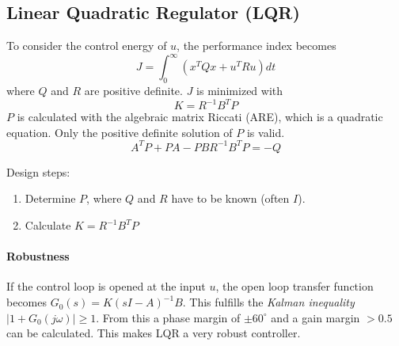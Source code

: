 \subsection{Linear Quadratic Regulator (LQR)}
To consider the control energy of $u$, the performance index becomes
\[
    J = \int_{0}^{\infty} (x^T Q x + u^T R u) dt
\]
where $Q$ and $R$ are positive definite.
$J$ is minimized with
\[
    K = R^{-1} B^T P
\]
$P$ is calculated with the algebraic matrix Riccati (ARE), which is a quadratic equation.
Only the positive definite solution of $P$ is valid.
\[
    A^T P + P A - P B R^{-1} B^T P = -Q
\]

Design steps:
\begin{enumerate}
    \item Determine $P$, where $Q$ and $R$ have to be known (often $I$).
    \item Calculate $K = R^{-1} B^T P$
\end{enumerate}

\paragraph{Robustness}If the control loop is opened at the input $u$, the open
loop transfer function becomes $G_0(s) = K (sI-A)^{-1} B$.
This fulfills the \emph{Kalman inequality} $|1+G_0(j\omega)|\geq 1$.
From this a phase margin of $\pm 60^{\circ}$ and a gain margin $>0.5$ can be
calculated.
This makes LQR a very robust controller.

